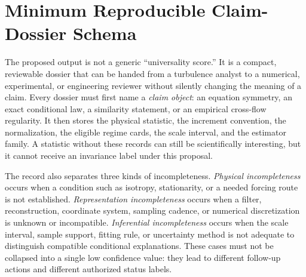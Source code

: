 \documentclass[conference]{../../../../Conference-LaTeX-template_10-17-19/IEEEtran}
\begin{document}
\section{Minimum Reproducible Claim-Dossier Schema}
The proposed output is not a generic ``universality score.'' It is a compact, reviewable dossier that can be handed from a turbulence analyst to a numerical, experimental, or engineering reviewer without silently changing the meaning of a claim. Every dossier must first name a \emph{claim object}: an equation symmetry, an exact conditional law, a similarity statement, or an empirical cross-flow regularity. It then stores the physical statistic, the increment convention, the normalization, the eligible regime cards, the scale interval, and the estimator family. A statistic without these records can still be scientifically interesting, but it cannot receive an invariance label under this proposal.

The record also separates three kinds of incompleteness. \emph{Physical incompleteness} occurs when a condition such as isotropy, stationarity, or a needed forcing route is not established. \emph{Representation incompleteness} occurs when a filter, reconstruction, coordinate system, sampling cadence, or numerical discretization is unknown or incompatible. \emph{Inferential incompleteness} occurs when the scale interval, sample support, fitting rule, or uncertainty method is not adequate to distinguish compatible conditional explanations. These cases must not be collapsed into a single low confidence value: they lead to different follow-up actions and different authorized status labels.
\end{document}
